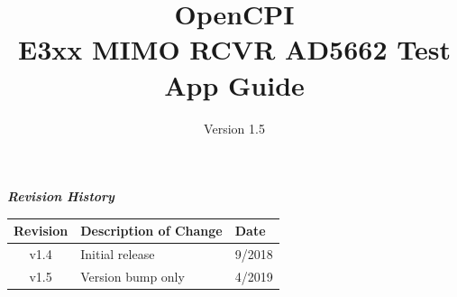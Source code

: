 \def\docTitle{OpenCPI\\ E3xx MIMO RCVR AD5662 Test App Guide}
\def\docVersion{1.5}

\date{Version \docVersion} %
\title{\docTitle}
\usepackage{graphicx}
\graphicspath{ {figures/} }
\usepackage{textcomp}
\usepackage{listings}


\maketitle
	\begin{center}
	\textit{\textbf{Revision History}}
		\begin{table}[H]
		\label{table:revisions} %
			\begin{tabularx}{\textwidth}{|c|X|l|}
			\hline
			\rowcolor{blue}
			\textbf{Revision} & \textbf{Description of Change} & \textbf{Date} \\
		    \hline
		    v1.4 & Initial release & 9/2018 \\
			\hline
		    v1.5 & Version bump only & 4/2019 \\
			\hline
			\end{tabularx}
		\end{table}
	\end{center}

